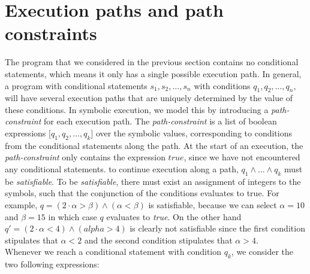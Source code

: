 \section{Execution paths and path constraints}
		The program that we considered in the previous section contains no conditional statements, which means it only has a single possible execution path. In general, a program with conditional statements $s_1, s_2, \ldots, s_n$ with conditions $q_1, q_2, \ldots, q_n$, will have several execution paths that are uniquely determined by the value of these conditions. In symbolic execution, we model this by introducing a \emph{path-constraint} for each execution path. The \emph{path-constraint} is a list of boolean expressions $\lbrack q_1, q_2, \ldots, q_k \rbrack$ over the symbolic values, corresponding to conditions from the conditional statements along the path. At the start of an execution, the \emph{path-constraint} only contains the expression $true$, since we have not encountered any conditional statements. to continue execution along a path, $q_1 \land \ldots \land q_k$ must be \emph{satisfiable}. To be \emph{satisfiable}, there must exist an assignment of integers to the symbols, such that the conjunction of the conditions evaluates to true. For example, $q = (2\cdot \alpha > \beta) \land (\alpha < \beta)$ is satisfiable, because we can select $\alpha = 10$ and $\beta = 15$ in which case $q$ evaluates to \emph{true}. On the other hand $q' = (2 \cdot \alpha < 4) \land (alpha > 4)$ is clearly not satisfiable since the first condition stipulates that $\alpha < 2$ and the second condition stipulates that $\alpha > 4$.
		\\
		
		\iffalse
		 This situation can for example occur if we are executing two consecutive \textsl{if}-statements, where the first one has condition $2\cdot \alpha < 4$ and the second has condition $\alpha > 4$. 
		\fi
	
		\noindent Whenever we reach a conditional statement with condition $q_k$, we consider the two following expressions:
	
